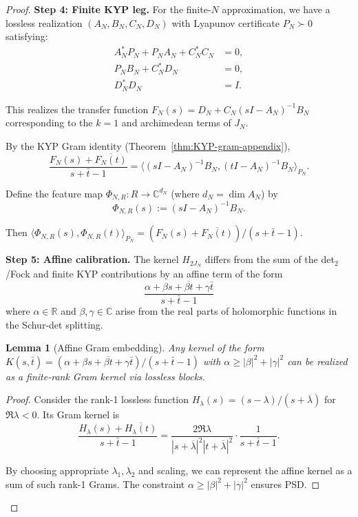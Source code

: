 \documentclass[11pt]{article}
\newtheorem{lemma}[theorem]{Lemma}
\theoremstyle{remark}
\begin{document}
\begin{proof}
\medskip
\noindent\textbf{Step 4: Finite KYP leg.}
For the finite-$N$ approximation, we have a lossless realization $(A_N, B_N, C_N, D_N)$ with Lyapunov certificate $P_N \succ 0$ satisfying:
\begin{align}
  A_N^* P_N + P_N A_N + C_N^* C_N &= 0,\\
  P_N B_N + C_N^* D_N &= 0,\\
  D_N^* D_N &= I.
\end{align}

This realizes the transfer function $F_N(s) = D_N + C_N(sI - A_N)^{-1}B_N$ corresponding to the $k=1$ and archimedean terms of $J_N$.

By the KYP Gram identity (Theorem~\ref{thm:KYP-gram-appendix}),
\[
  \frac{F_N(s) + \overline{F_N(t)}}{s + \bar t - 1} = \langle (sI - A_N)^{-1}B_N, (tI - A_N)^{-1}B_N \rangle_{P_N}.
\]

Define the feature map $\Phi_{N,R}: R \to \mathbb{C}^{d_N}$ (where $d_N = \dim A_N$) by
\[
  \Phi_{N,R}(s) := (sI - A_N)^{-1}B_N.
\]

Then $\langle \Phi_{N,R}(s), \Phi_{N,R}(t) \rangle_{P_N} = (F_N(s) + \overline{F_N(t)})/(s + \bar t - 1)$.

\medskip
\noindent\textbf{Step 5: Affine calibration.}
The kernel $H_{2J_N}$ differs from the sum of the det$_2$/Fock and finite KYP contributions by an affine term of the form
\[
  \frac{\alpha + \beta s + \overline{\beta t} + \gamma \bar t}{s + \bar t - 1}
\]
where $\alpha \in \mathbb{R}$ and $\beta, \gamma \in \mathbb{C}$ arise from the real parts of holomorphic functions in the Schur-det splitting.

\begin{lemma}[Affine Gram embedding]\label{lem:affine-gram-embedding}
Any kernel of the form $K(s,\bar t) = (\alpha + \beta s + \overline{\beta t} + \gamma \bar t)/(s + \bar t - 1)$ with $\alpha \geq |\beta|^2 + |\gamma|^2$ can be realized as a finite-rank Gram kernel via lossless blocks.
\end{lemma}

\begin{proof}
Consider the rank-1 lossless function $H_\lambda(s) = (s - \lambda)/(s + \overline{\lambda})$ for $\Re \lambda < 0$. Its Gram kernel is
\[
  \frac{H_\lambda(s) + \overline{H_\lambda(t)}}{s + \bar t - 1} = \frac{2\Re \lambda}{|s + \overline{\lambda}|^2 |t + \overline{\lambda}|^2} \cdot \frac{1}{s + \bar t - 1}.
\]

By choosing appropriate $\lambda_1, \lambda_2$ and scaling, we can represent the affine kernel as a sum of such rank-1 Grams. The constraint $\alpha \geq |\beta|^2 + |\gamma|^2$ ensures PSD.
\end{proof}


\end{proof}
\end{document}

